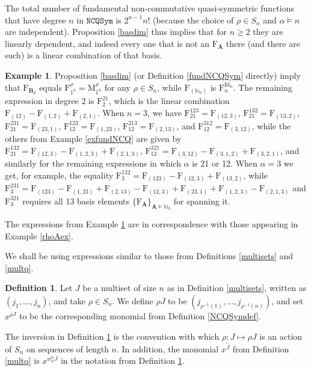 \documentclass{article}
\theoremstyle{definition}
\newtheorem{defn}[thm]{Definition}
\newtheorem{ex}[thm]{Example}
\begin{document}
The total number of fundamental non-commutative quasi-symmetric functions that have degree $n$ in $\mathtt{NCQSym}$ is $2^{n-1}n!$ (because the choice of $\rho \in S_{n}$ and $\alpha \vDash n$ are independent). Proposition \ref{basdim} thus implies that for $n\geq2$ they are linearly dependent, and indeed every one that is not an $\mathrm{F}_{\mathbf{A}}$ there (and there are such) is a linear combination of that basis.
\begin{ex}
Proposition \ref{basdim} (or Definition \ref{fundNCQSym} directly) imply that $\mathrm{F}_{\mathbf{B}_{\rho}}$ equals $\mathrm{F}_{1^{n}}^{\rho}=\mathrm{M}_{1^{n}}^{\rho}$ for any $\rho \in S_{n}$, while $\mathrm{F}_{(\mathbb{N}_{n})}$ is $\mathrm{F}_{n}^{\operatorname{Id}_{n}}$. The remaining expression in degree 2 is $\mathrm{F}_{2}^{21}$, which is the linear combination $\mathrm{F}_{(12)}-\mathrm{F}_{(1,2)}+\mathrm{F}_{(2,1)}$. When $n=3$, we have $\mathrm{F}_{21}^{123}=\mathrm{F}_{(12,3)}$, $\mathrm{F}_{21}^{132}=\mathrm{F}_{(13,2)}$, $\mathrm{F}_{21}^{231}=\mathrm{F}_{(23,1)}$, $\mathrm{F}_{12}^{123}=\mathrm{F}_{(1,23)}$, $\mathrm{F}_{12}^{213}=\mathrm{F}_{(2,13)}$, and $\mathrm{F}_{12}^{312}=\mathrm{F}_{(3,12)}$, while the others from Example \ref{exfundNCQ} are given by $\mathrm{F}_{21}^{132}=\mathrm{F}_{(12,3)}-\mathrm{F}_{(1,2,3)}+\mathrm{F}_{(2,1,3)}$, $\mathrm{F}_{12}^{321}=\mathrm{F}_{(3,12)}-\mathrm{F}_{(3,1,2)}+\mathrm{F}_{(3,2,1)}$, and similarly for the remaining expressions in which $\alpha$ is 21 or 12. When $\alpha=3$ we get, for example, the equality $\mathrm{F}_{3}^{132}=\mathrm{F}_{(123)}-\mathrm{F}_{(12,3)}+\mathrm{F}_{(13,2)}$, while $\mathrm{F}_{3}^{231}=\mathrm{F}_{(123)}-\mathrm{F}_{(1,23)}+\mathrm{F}_{(2,13)}-\mathrm{F}_{(12,3)}+\mathrm{F}_{(23,1)}+\mathrm{F}_{(1,2,3)}-\mathrm{F}_{(2,1,3)}$ and $\mathrm{F}_{3}^{321}$ requires all 13 basis elements $\{\mathrm{F}_{\mathbf{A}}\}_{\mathbf{A}\vDash\mathbb{N}_{3}}$ for spanning it. \label{FAex}
\end{ex}
The expressions from Example \ref{FAex} are in correspondence with those appearing in Example \ref{rhoAex}.

\medskip

We shall be using expressions similar to those from Definitions \ref{multisets} and \ref{multq}.
\begin{defn}
Let $J$ be a multiset of size $n$ as in Definition \ref{multisets}, written as $(j_{1},\ldots,j_{n})$, and take $\rho \in S_{n}$. We define $\rho J$ to be $(j_{\rho^{-1}(1)},\ldots,j_{\rho^{-1}(n)})$, and set $x^{\rho J}$ to be the corresponding monomial from Definition \ref{NCQSymdef}. \label{multNC}
\end{defn}
The inversion in Definition \ref{multNC} is the convention with which $\rho:J\mapsto\rho J$ is an action of $S_{n}$ on sequences of length $n$. In addition, the monomial $x^{\tilde{J}}$ from Definition \ref{multq} is $x^{w^{0}_{n}J}$ in the notation from Definition \ref{multNC}.
\end{document}
